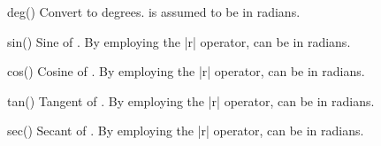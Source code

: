 \begin{math-function}{deg()}
\mathcommand
    Convert  to degrees.  is assumed to be in radians.
\begin{codeexample}[]
 \pgfmathresult
\end{codeexample}
\end{math-function}

\begin{math-function}{sin()}
\mathcommand
    Sine of . By employing the |r| operator,  can be in
    radians.
\begin{codeexample}[]
 \pgfmathresult
\end{codeexample}

\begin{codeexample}[]
 \pgfmathresult
\end{codeexample}
\end{math-function}

\begin{math-function}{cos()}
\mathcommand
    Cosine of . By employing the |r| operator,  can be in
    radians.
\begin{codeexample}[]
 \pgfmathresult
\end{codeexample}

\begin{codeexample}[]
 \pgfmathresult
\end{codeexample}
\end{math-function}

\begin{math-function}{tan()}
\mathcommand
    Tangent of . By employing the |r| operator,  can be in
    radians.
\begin{codeexample}[]
 \pgfmathresult
\end{codeexample}

\begin{codeexample}[]
 \pgfmathresult
\end{codeexample}
\end{math-function}

\begin{math-function}{sec()}
\mathcommand
    Secant of . By employing the |r| operator,  can be in
    radians.
\begin{codeexample}[]
 \pgfmathresult
\end{codeexample}
\end{math-function}

